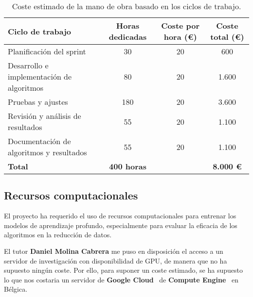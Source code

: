 \begin{table}[htp]\label{tab:mano-de-obra}
    \centering
    \begin{adjustbox}{width=\linewidth}
        \begin{tabular}{|l|c|c|c|}
            \hline
            \textbf{Ciclo de trabajo}                 & \textbf{Horas dedicadas} & \textbf{Coste por hora (€)} &
            \textbf{Coste total (€)}                                                                                              \\ \hline
            Planificación del sprint                  & 30                       & 20                          & 600              \\
            Desarrollo e implementación de algoritmos & 80                       & 20                          & 1.600            \\
            Pruebas y ajustes                         & 180                      & 20                          & 3.600            \\
            Revisión y análisis de resultados         & 55                       & 20                          & 1.100            \\
            Documentación de algoritmos y resultados  & 55                       & 20                          & 1.100            \\ \hline
            \textbf{Total}                            & \textbf{400 horas}       &                             & \textbf{8.000 €} \\ \hline
        \end{tabular}
    \end{adjustbox}
    \caption{Coste estimado de la mano de obra basado en los ciclos de trabajo.}
\end{table}


\subsection{Recursos computacionales}\label{subsec:recursos-computacionales}
El proyecto ha requerido el uso de recursos computacionales para entrenar los modelos de aprendizaje profundo,
especialmente para evaluar la eficacia de los algoritmos en la reducción de datos.


El tutor \textbf{Daniel Molina Cabrera} me puso en disposición el acceso a un servidor de investigación con
disponibilidad de GPU, de manera que no ha supuesto ningún coste.
Por ello, para suponer un coste estimado, se ha supuesto lo que nos costaria un servidor de
\textbf{Google Cloud}~\cite{noauthor_overview_nodate} de \textbf{Compute Engine}~\cite{noauthor_what_nodate} en
Bélgica.


